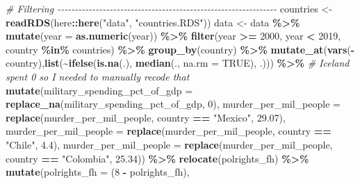 \documentclass[
  english,
  man,floatsintext]{apa6}
\newenvironment{Shaded}{\begin{snugshade}}{\end{snugshade}}
\newcommand{\CommentTok}[1]{\textcolor[rgb]{0.56,0.35,0.01}{\textit{#1}}}
\newcommand{\DataTypeTok}[1]{\textcolor[rgb]{0.13,0.29,0.53}{#1}}
\newcommand{\DecValTok}[1]{\textcolor[rgb]{0.00,0.00,0.81}{#1}}
\newcommand{\FloatTok}[1]{\textcolor[rgb]{0.00,0.00,0.81}{#1}}
\newcommand{\KeywordTok}[1]{\textcolor[rgb]{0.13,0.29,0.53}{\textbf{#1}}}
\newcommand{\NormalTok}[1]{#1}
\newcommand{\OperatorTok}[1]{\textcolor[rgb]{0.81,0.36,0.00}{\textbf{#1}}}
\newcommand{\OtherTok}[1]{\textcolor[rgb]{0.56,0.35,0.01}{#1}}
\newcommand{\StringTok}[1]{\textcolor[rgb]{0.31,0.60,0.02}{#1}}
\begin{document}
\begin{Shaded}
\begin{Highlighting}[]
\CommentTok{\# Filtering {-}{-}{-}{-}{-}{-}{-}{-}{-}{-}{-}{-}{-}{-}{-}{-}{-}{-}{-}{-}{-}{-}{-}{-}{-}{-}{-}{-}{-}{-}{-}{-}{-}{-}{-}{-}{-}{-}{-}{-}{-}{-}{-}{-}{-}{-}{-}{-}{-}{-}{-}{-}{-}{-}{-}{-}{-}{-}{-}{-}{-}{-}{-}}
\NormalTok{countries \textless{}{-}}\StringTok{ }\KeywordTok{readRDS}\NormalTok{(here}\OperatorTok{::}\KeywordTok{here}\NormalTok{(}\StringTok{"data"}\NormalTok{, }\StringTok{"countries.RDS"}\NormalTok{))}
\NormalTok{data \textless{}{-}}\StringTok{ }\NormalTok{data }\OperatorTok{\%\textgreater{}\%}
\StringTok{  }\KeywordTok{mutate}\NormalTok{(}\DataTypeTok{year =} \KeywordTok{as.numeric}\NormalTok{(year)) }\OperatorTok{\%\textgreater{}\%}\StringTok{ }
\StringTok{  }\KeywordTok{filter}\NormalTok{(year }\OperatorTok{\textgreater{}=}\StringTok{ }\DecValTok{2000}\NormalTok{, year }\OperatorTok{\textless{}}\StringTok{ }\DecValTok{2019}\NormalTok{, country }\OperatorTok{\%in\%}\StringTok{ }\NormalTok{countries) }\OperatorTok{\%\textgreater{}\%}\StringTok{ }
\StringTok{  }\KeywordTok{group\_by}\NormalTok{(country) }\OperatorTok{\%\textgreater{}\%}
\StringTok{  }\KeywordTok{mutate\_at}\NormalTok{(}\KeywordTok{vars}\NormalTok{(}\OperatorTok{{-}}\NormalTok{country),}\KeywordTok{list}\NormalTok{(}\OperatorTok{\textasciitilde{}}\KeywordTok{ifelse}\NormalTok{(}\KeywordTok{is.na}\NormalTok{(.), }\KeywordTok{median}\NormalTok{(., }\DataTypeTok{na.rm =} \OtherTok{TRUE}\NormalTok{), .))) }\OperatorTok{\%\textgreater{}\%}\StringTok{ }
\CommentTok{\# Iceland spent 0 so I needed to manually recode that}
\StringTok{  }\KeywordTok{mutate}\NormalTok{(}\DataTypeTok{military\_spending\_pct\_of\_gdp =} \KeywordTok{replace\_na}\NormalTok{(military\_spending\_pct\_of\_gdp, }\DecValTok{0}\NormalTok{),}
  \DataTypeTok{murder\_per\_mil\_people =} \KeywordTok{replace}\NormalTok{(murder\_per\_mil\_people, country }\OperatorTok{==}\StringTok{ "Mexico"}\NormalTok{, }\FloatTok{29.07}\NormalTok{),}
         \DataTypeTok{murder\_per\_mil\_people =} \KeywordTok{replace}\NormalTok{(murder\_per\_mil\_people, country }\OperatorTok{==}\StringTok{ "Chile"}\NormalTok{, }\FloatTok{4.4}\NormalTok{),}
         \DataTypeTok{murder\_per\_mil\_people =} \KeywordTok{replace}\NormalTok{(murder\_per\_mil\_people, country }\OperatorTok{==}\StringTok{ "Colombia"}\NormalTok{, }\FloatTok{25.34}\NormalTok{)) }\OperatorTok{\%\textgreater{}\%}\StringTok{ }
\StringTok{  }\KeywordTok{relocate}\NormalTok{(polrights\_fh) }\OperatorTok{\%\textgreater{}\%}\StringTok{ }
\StringTok{  }\KeywordTok{mutate}\NormalTok{(}\DataTypeTok{polrights\_fh =}\NormalTok{ (}\DecValTok{8} \OperatorTok{{-}}\StringTok{ }\NormalTok{polrights\_fh),}

\end{Highlighting}
\end{Shaded}
\end{document}
